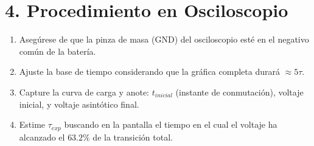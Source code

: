 \documentclass[11pt, a4paper]{article}
\begin{document}
\section*{4. Procedimiento en Osciloscopio}
\begin{enumerate}
    \item Asegúrese de que la pinza de masa (GND) del osciloscopio esté en el negativo común de la batería.
    \item Ajuste la base de tiempo considerando que la gráfica completa durará $\approx 5\tau$.
    \item Capture la curva de carga y anote: $t_{inicial}$ (instante de conmutación), voltaje inicial, y voltaje asintótico final.
    \item Estime $\tau_{exp}$ buscando en la pantalla el tiempo en el cual el voltaje ha alcanzado el $\mathbf{63.2\%}$ de la transición total.
\end{enumerate}
\end{document}
